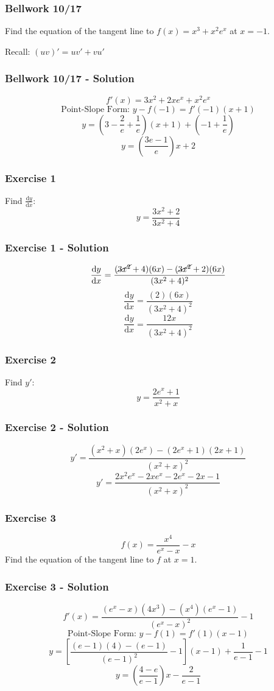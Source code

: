 \documentclass[12pt]{beamer}
\begin{document}
\begin{frame}
	\frametitle{Bellwork 10/17}
	\initclock

	\vfill
	\vfill
	\vfill
	\vfill
	\Large
	Find the equation of the tangent line to $f(x)=x^3+x^2e^x$ at $x=-1$.\par
	\vfill
	\vfill
	Recall: $(uv)'=uv'+vu'$
	\vfill
	\vfill
	\vfill
	\vfill
	\vfill

	\small
	\crono
\end{frame}
\begin{frame}
	\frametitle{Bellwork 10/17 - Solution}

	\Large
	\[f'(x) = 3x^2 + 2xe^x + x^2e^x\]
	\vfill
	\[\text{Point-Slope Form: }y-f(-1)=f'(-1)(x+1)\]
	\[y = \left(3-\frac{2}{e}+\frac{1}{e}\right)(x+1)+\left(-1+\frac{1}{e}\right)\]
	\[\boxed{y = \left(\frac{3e-1}{e}\right)x+2}\] %
	\vfill
\end{frame}
\begin{frame}
	\frametitle{Exercise 1}

	\LARGE
	Find $\frac{\mathrm{d}y}{\mathrm{d}x}$: \[y=\frac{3x^2+2}{3x^2+4}\]
\end{frame}
\begin{frame}
	\frametitle{Exercise 1 - Solution}

	\large
	\[\frac{\mathrm{d}y}{\mathrm{d}x}=\frac{(\cancel{3x^2}+4)(6x)-(\cancel{3x^2}+2)(6x)}{(3x^2+4)^2}\]
	\[\frac{\mathrm{d}y}{\mathrm{d}x}=\frac{(2)(6x)}{(3x^2+4)^2}\]
	\[\boxed{\frac{\mathrm{d}y}{\mathrm{d}x}=\frac{12x}{(3x^2+4)^2}}\]
\end{frame}
\begin{frame}
	\frametitle{Exercise 2}

	\LARGE
	Find $y'$: \[y=\frac{2e^x+1}{x^2+x}\]
\end{frame}
\begin{frame}
	\frametitle{Exercise 2 - Solution}

	\Large
	\[y'=\frac{(x^2+x)(2e^x)-(2e^x+1)(2x+1)}{(x^2+x)^2}\]
	\[\boxed{y'=\frac{2x^2e^x-2xe^x-2e^x-2x-1}{(x^2+x)^2}}\]
\end{frame}
\begin{frame}
	\frametitle{Exercise 3}

	\LARGE
	\[f(x)=\frac{x^4}{e^x-x}-x\]
	\vfill
	Find the equation of the tangent line to $f$ at $x=1$.
\end{frame}
\begin{frame}
	\frametitle{Exercise 3 - Solution}

	\large
	\[f'(x)=\frac{(e^x-x)(4x^3)-(x^4)(e^x-1)}{(e^x-x)^2}-1\]
	\vfill
	\[\text{Point-Slope Form: }y-f(1)=f'(1)(x-1)\]
	\[y=\left[\frac{(e-1)(4)-(e-1)}{(e-1)^2}-1\right](x-1)+\frac{1}{e-1}-1\]
	\[\boxed{y=\left(\frac{4-e}{e-1}\right)x-\frac{2}{e-1}}\]
	\vfill
	\vfill
\end{frame}
\end{document}
